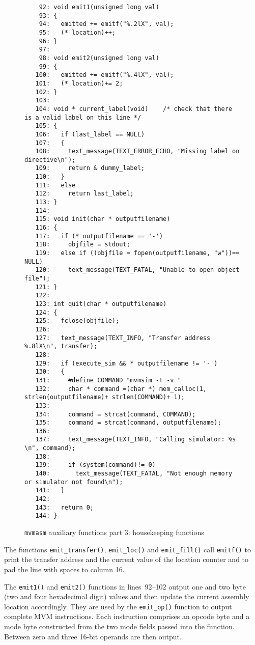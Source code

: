 \begin{figure}
\hspace*{-1cm}
\begin{minipage}{30cm}
\footnotesize
\begin{verbatim}
    92: void emit1(unsigned long val)
    93: {
    94:   emitted += emitf("%.2lX", val); 
    95:   (* location)++; 
    96: }
    97: 
    98: void emit2(unsigned long val)
    99: {
   100:   emitted += emitf("%.4lX", val); 
   101:   (* location)+= 2; 
   102: }
   103: 
   104: void * current_label(void)    /* check that there is a valid label on this line */
   105: {
   106:   if (last_label == NULL)
   107:   {
   108:     text_message(TEXT_ERROR_ECHO, "Missing label on directive\n"); 
   109:     return & dummy_label; 
   110:   }
   111:   else
   112:     return last_label; 
   113: }
   114: 
   115: void init(char * outputfilename)
   116: {
   117:   if (* outputfilename == '-')
   118:     objfile = stdout; 
   119:   else if ((objfile = fopen(outputfilename, "w"))== NULL)
   120:     text_message(TEXT_FATAL, "Unable to open object file"); 
   121: }
   122:
   123: int quit(char * outputfilename)
   124: {
   125:   fclose(objfile); 
   126:   
   127:   text_message(TEXT_INFO, "Transfer address %.8lX\n", transfer); 
   128:   
   129:   if (execute_sim && * outputfilename != '-')
   130:   {
   131:     #define COMMAND "mvmsim -t -v "
   132:     char * command =(char *) mem_calloc(1, strlen(outputfilename)+ strlen(COMMAND)+ 1); 
   133:     
   134:     command = strcat(command, COMMAND); 
   135:     command = strcat(command, outputfilename); 
   136:     
   137:     text_message(TEXT_INFO, "Calling simulator: %s \n", command); 
   138:     
   139:     if (system(command)!= 0)
   140:       text_message(TEXT_FATAL, "Not enough memory or simulator not found\n"); 
   141:   }
   142:   
   143:   return 0; 
   144: }
\end{verbatim}
\end{minipage}
\caption{{\tt mvmasm} auxiliary functions part 3: housekeeping functions}
\label{mvm_aux.c:3}
\end{figure}

The functions \verb+emit_transfer()+, \verb+emit_loc()+ and \verb+emit_fill()+ call 
\verb+emitf()+ to print the transfer address and the current value of the location
counter and to pad the line with spaces to column 16. 

The \verb+emit1()+ and \verb+emit2()+
functions in lines~92--102 output one and two byte (two and four hexadecimal digit) values
and then update the current assembly location accordingly. They are used by the \verb+emit_op()+
function to output complete MVM instructions. Each instruction comprises an opcode byte and
a mode byte constructed from the two mode fields passed into the function. Between zero
and three 16-bit operands are then output.


